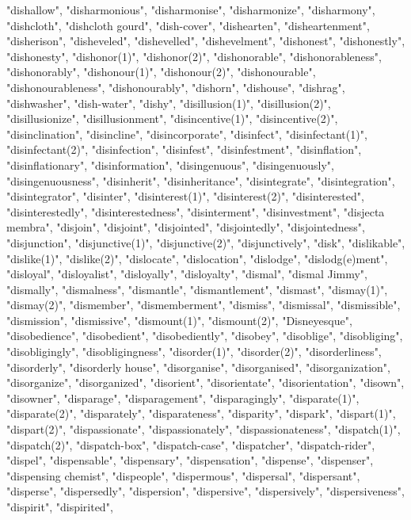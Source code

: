 "dishallow",
"disharmonious",
"disharmonise",
"disharmonize",
"disharmony",
"dishcloth",
"dishcloth gourd",
"dish-cover",
"dishearten",
"disheartenment",
"disherison",
"disheveled",
"dishevelled",
"dishevelment",
"dishonest",
"dishonestly",
"dishonesty",
"dishonor(1)",
"dishonor(2)",
"dishonorable",
"dishonorableness",
"dishonorably",
"dishonour(1)",
"dishonour(2)",
"dishonourable",
"dishonourableness",
"dishonourably",
"dishorn",
"dishouse",
"dishrag",
"dishwasher",
"dish-water",
"dishy",
"disillusion(1)",
"disillusion(2)",
"disillusionize",
"disillusionment",
"disincentive(1)",
"disincentive(2)",
"disinclination",
"disincline",
"disincorporate",
"disinfect",
"disinfectant(1)",
"disinfectant(2)",
"disinfection",
"disinfest",
"disinfestment",
"disinflation",
"disinflationary",
"disinformation",
"disingenuous",
"disingenuously",
"disingenuousness",
"disinherit",
"disinheritance",
"disintegrate",
"disintegration",
"disintegrator",
"disinter",
"disinterest(1)",
"disinterest(2)",
"disinterested",
"disinterestedly",
"disinterestedness",
"disinterment",
"disinvestment",
"disjecta membra",
"disjoin",
"disjoint",
"disjointed",
"disjointedly",
"disjointedness",
"disjunction",
"disjunctive(1)",
"disjunctive(2)",
"disjunctively",
"disk",
"dislikable",
"dislike(1)",
"dislike(2)",
"dislocate",
"dislocation",
"dislodge",
"dislodg(e)ment",
"disloyal",
"disloyalist",
"disloyally",
"disloyalty",
"dismal",
"dismal Jimmy",
"dismally",
"dismalness",
"dismantle",
"dismantlement",
"dismast",
"dismay(1)",
"dismay(2)",
"dismember",
"dismemberment",
"dismiss",
"dismissal",
"dismissible",
"dismission",
"dismissive",
"dismount(1)",
"dismount(2)",
"Disneyesque",
"disobedience",
"disobedient",
"disobediently",
"disobey",
"disoblige",
"disobliging",
"disobligingly",
"disobligingness",
"disorder(1)",
"disorder(2)",
"disorderliness",
"disorderly",
"disorderly house",
"disorganise",
"disorganised",
"disorganization",
"disorganize",
"disorganized",
"disorient",
"disorientate",
"disorientation",
"disown",
"disowner",
"disparage",
"disparagement",
"disparagingly",
"disparate(1)",
"disparate(2)",
"disparately",
"disparateness",
"disparity",
"dispark",
"dispart(1)",
"dispart(2)",
"dispassionate",
"dispassionately",
"dispassionateness",
"dispatch(1)",
"dispatch(2)",
"dispatch-box",
"dispatch-case",
"dispatcher",
"dispatch-rider",
"dispel",
"dispensable",
"dispensary",
"dispensation",
"dispense",
"dispenser",
"dispensing chemist",
"dispeople",
"dispermous",
"dispersal",
"dispersant",
"disperse",
"dispersedly",
"dispersion",
"dispersive",
"dispersively",
"dispersiveness",
"dispirit",
"dispirited",
